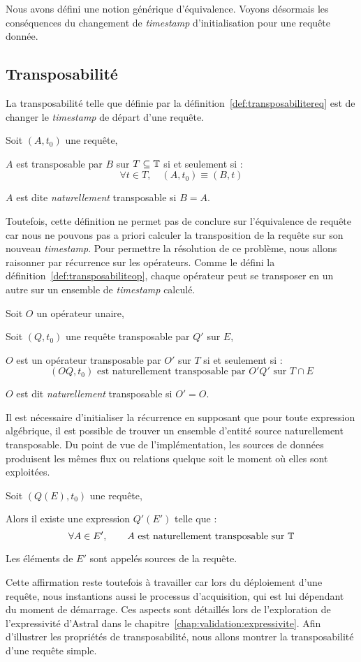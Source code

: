 Nous avons défini une notion générique d'équivalence. Voyons désormais les conséquences du changement de \textit{timestamp} d'initialisation pour une requête donnée.
\subsection{Transposabilité}
La transposabilité telle que définie par la définition~\ref{def:transposabilitereq} est de changer le \textit{timestamp} de départ d'une requête.
\begin{defi}\label{def:transposabilitereq}
    Soit $(A,t_0)$ une requête,

    $A$ est transposable par $B$ sur $T\subseteq \mathbb{T}$ si et seulement si : $$\forall t\in T, \quad (A,t_0) \equiv (B,t)$$

    $A$ est dite \textit{naturellement} transposable si $B=A$.
\end{defi}
Toutefois, cette définition ne permet pas de conclure sur l'équivalence de requête car nous ne pouvons pas a priori calculer la transposition de la requête sur son nouveau \textit{timestamp}. Pour permettre la résolution de ce problème, nous allons raisonner par récurrence sur les opérateurs. Comme le défini la définition~\ref{def:transposabiliteop}, chaque opérateur peut se transposer en un autre sur un ensemble de \textit{timestamp} calculé.
\begin{defi}\label{def:transposabiliteop}
    Soit $O$ un opérateur unaire,

    Soit $(Q,t_0)$ une requête transposable par $Q'$ sur $E$,

    $O$ est un opérateur transposable par $O'$ sur $T$ si et seulement si : $$(OQ,t_0) \textrm{ est naturellement transposable par } O'Q' \textrm{ sur } T\cap E$$

    $O$ est dit \textit{naturellement} transposable si $O'=O$.
\end{defi}

Il est nécessaire d'initialiser la récurrence en supposant que pour toute expression algébrique, il est possible de trouver un ensemble d'entité source naturellement transposable. Du point de vue de l'implémentation, les sources de données produisent les mêmes flux ou relations quelque soit le moment où elles sont exploitées.
\begin{hyp}\label{hyp:transposabilite}
    Soit $(Q(E),t_0)$ une requête,

    Alors il existe une expression $Q'(E')$ telle que : $$\forall A\in E', \qquad A \textrm{ est naturellement transposable sur } \mathbb{T}$$
    
    Les éléments de $E'$ sont appelés sources de la requête.
\end{hyp}
Cette affirmation reste toutefois à travailler car lors du déploiement d'une requête, nous instantions aussi le processus d'acquisition, qui est lui dépendant du moment de démarrage. Ces aspects sont détaillés lors de l'exploration de l'expressivité d'Astral dans le chapitre~\ref{chap:validation:expressivite}. Afin d'illustrer les propriétés de transposabilité, nous allons montrer la transposabilité d'une requête simple.

